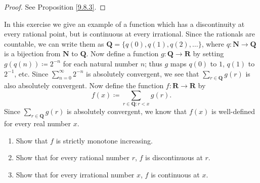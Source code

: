 \begin{proof}
    See Proposition \ref{9.8.3}.
\end{proof}

\begin{exercise}\label{ex 9.8.5}
    In this exercise we give an example of a function which has a discontinuity at every rational point, but is continuous at every irrational.
    Since the rationals are countable, we can write them as \(\mathbf{Q} = \{q(0), q(1), q(2), \dots\}\), where \(q : \mathbf{N} \to \mathbf{Q}\) is a bijection from \(\mathbf{N}\) to \(\mathbf{Q}\).
    Now define a function \(g : \mathbf{Q} \to \mathbf{R}\) by setting \(g(q(n)) \coloneqq 2^{-n}\) for each natural number \(n\);
    thus \(g\) maps \(q(0)\) to \(1\), \(q(1)\) to \(2^{-1}\), etc.
    Since \(\sum_{n = 0}^\infty 2^{-n}\) is absolutely convergent, we see that \(\sum_{r \in \mathbf{Q}} g(r)\) is also absolutely convergent.
    Now define the function \(f : \mathbf{R} \to \mathbf{R}\) by
    \[
        f(x) \coloneqq \sum_{r \in \mathbf{Q} : r < x} g(r).
    \]
    Since \(\sum_{r \in \mathbf{Q}} g(r)\) is absolutely convergent, we know that \(f(x)\) is well-defined for every real number \(x\).
    \begin{enumerate}
        \item Show that \(f\) is strictly monotone increasing.
        \item Show that for every rational number \(r\), \(f\) is discontinuous at \(r\).
        \item Show that for every irrational number \(x\), \(f\) is continuous at \(x\).
    \end{enumerate}
\end{exercise}